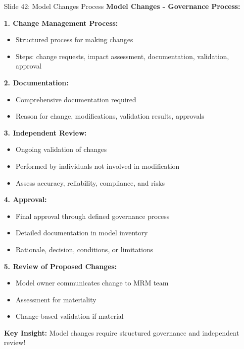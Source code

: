 \documentclass[8pt]{beamer}
\begin{document}
	\begin{frame}{Slide 42: Model Changes Process}
		\fontsize{6.5}{7.5}\selectfont
		\textbf{Model Changes - Governance Process:}
		
		\vspace{0.1cm}
		\textbf{1. Change Management Process:}
		\begin{itemize}
			\item Structured process for making changes
			\item Steps: change requests, impact assessment, documentation, validation, approval
		\end{itemize}
		
		\vspace{0.1cm}
		\textbf{2. Documentation:}
		\begin{itemize}
			\item Comprehensive documentation required
			\item Reason for change, modifications, validation results, approvals
		\end{itemize}
		
		\vspace{0.1cm}
		\textbf{3. Independent Review:}
		\begin{itemize}
			\item Ongoing validation of changes
			\item Performed by individuals not involved in modification
			\item Assess accuracy, reliability, compliance, and risks
		\end{itemize}
		
		\vspace{0.1cm}
		\textbf{4. Approval:}
		\begin{itemize}
			\item Final approval through defined governance process
			\item Detailed documentation in model inventory
			\item Rationale, decision, conditions, or limitations
		\end{itemize}
		
		\vspace{0.1cm}
		\textbf{5. Review of Proposed Changes:}
		\begin{itemize}
			\item Model owner communicates change to MRM team
			\item Assessment for materiality
			\item Change-based validation if material
		\end{itemize}
		
		\textcolor{myblue}{\textbf{Key Insight:}} Model changes require \textcolor{myblue}{structured governance and independent review}!
	\end{frame}
	
\end{document}
